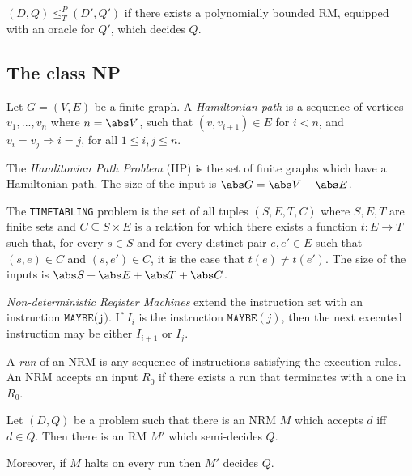 \documentclass{article}
\begin{document}
\begin{definition*}
	$(D,Q)\leq^P_T (D',Q')$ if there exists a polynomially bounded RM, equipped with an oracle
	for $Q'$, which decides $Q$.
\end{definition*}

\subsection{The class NP}

\begin{definition*}
	Let $G=(V,E)$ be a finite graph. A \emph{Hamiltonian path} is a sequence of vertices
	$v_1,...,v_n$ where $n=\abs V$, such that $(v,v_{i+1})\in E$ for $i<n$, and $v_i=v_j
		\Rightarrow i=j$, for all $1\leq i,j\leq n$.

	The \emph{Hamlitonian Path Problem} (HP) is the set of finite graphs which have a Hamiltonian
	path. The size of the input is $\abs G = \abs V + \abs E$.
\end{definition*}

\begin{definition*}[Timetabling]
	The \texttt{TIMETABLING} problem is the set of all tuples $(S,E,T,C)$ where $S,E,T$ are finite
	sets and $C\subseteq S\times E$ is a relation for which there exists a function $t:E\to T$
	such that, for every $s\in S$ and for every distinct pair $e,e'\in E$ such that $(s,e)\in C$
	and $(s,e')\in C$, it is the case that $t(e)\not=t(e')$.
	The size of the inputs is $\abs S + \abs E + \abs T + \abs C$.
\end{definition*}


\begin{definition*}[NRM]
	\emph{Non-deterministic Register Machines} extend the instruction set with an instruction
	$\texttt{MAYBE(j)}$. If $I_i$ is the instruction $\texttt{MAYBE}(j)$, then the next executed instruction
	may be either $I_{i+1}$ or $I_j$.

	A \emph{run} of an NRM is any sequence of instructions satisfying the execution rules. An NRM accepts
	an input $R_0$ if there exists a run that terminates with a one in $R_0$.
\end{definition*}

\begin{theorem*}[Notes II.10]
	Let $(D,Q)$ be a problem such that there is an NRM $M$ which accepts $d$ iff $d\in Q$.
	Then there is an RM $M'$ which semi-decides $Q$.

	Moreover, if $M$ halts on every run then $M'$ decides $Q$.
\end{theorem*}
\end{document}
